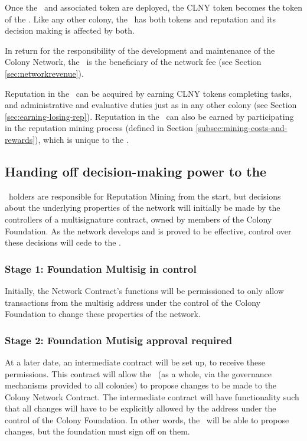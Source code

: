 Once the \rc\ and associated token are deployed, the CLNY token becomes the token of the \rc. Like any other colony, the \rc\ has both tokens and reputation and its decision making is affected by both.

In return for the responsibility of the development and maintenance of the Colony Network, the \rc\ is the beneficiary of the network fee (see Section \ref{sec:networkrevenue}).

Reputation in the \rc\ can be acquired by earning CLNY tokens completing tasks, and administrative and evaluative duties just as in any other colony (see Section \ref{sec:earning-losing-rep}). Reputation in the \rc\ can also be earned by participating in the reputation mining process (defined in Section \ref{subsec:mining-costs-and-rewards}), which is unique to the \rc.

\subsection{Handing off decision-making power to the \rc}\label{subsec:ceding-control-to-rc}
\rct\ holders are responsible for Reputation Mining from the start, but decisions about the underlying properties of the network will initially be made by the controllers of a multisignature contract, owned by members of the Colony Foundation. As the network develops and is proved to be effective, control over these decisions will cede to the \rc.

\subsubsection*{Stage 1: Foundation Multisig in control}
Initially, the Network Contract's functions will be permissioned to only allow transactions from the multisig address under the control of the Colony Foundation to change these properties of the network. 

\subsubsection*{Stage 2: Foundation Mutisig approval required}
At a later date, an intermediate contract will be set up, to receive these permissions. This contract will allow the \rc\ (as a whole, via the governance mechanisms provided to all colonies) to propose changes to be made to the Colony Network Contract. The intermediate contract will have functionality such that all changes will have to be explicitly allowed by the address under the control of the Colony Foundation. In other words, the \rc\ will be able to propose changes, but the foundation must sign off on them.

